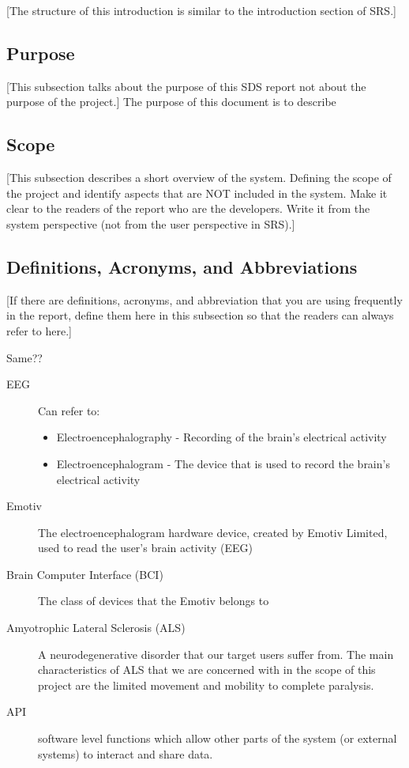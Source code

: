 \documentclass{article}
\begin{document}
[The structure of this introduction is similar to the introduction section of SRS.]

\subsection{Purpose}

[This subsection talks about the purpose of this SDS report not about the purpose of the project.]
The purpose of this document is to describe

\subsection{Scope}

[This subsection describes a short overview of the system.  Defining the scope of the project and identify aspects that are NOT included in the system.  Make it clear to the readers of the report who are the developers.  Write it from the system perspective (not from the user perspective in SRS).]

\subsection{Definitions, Acronyms, and Abbreviations}

[If there are definitions, acronyms, and abbreviation that you are using frequently in the report, define them here in this subsection so that the readers can always refer to here.]

Same??

\begin{description}
    \item[EEG] Can refer to:
        \begin{itemize}
            \item Electroencephalography - Recording of the brain's electrical
                activity 
	        \item Electroencephalogram - The device that is used to record the
	            brain's electrical activity
        \end{itemize}
    \item[Emotiv] The electroencephalogram hardware device, created by Emotiv
        Limited, used to read the user's brain activity (EEG)
    \item[Brain Computer Interface (BCI)] The class of devices that the Emotiv
        belongs to
    \item[Amyotrophic Lateral Sclerosis (ALS)] A neurodegenerative disorder
        that our target users suffer from. The main characteristics of ALS
        that we are concerned with in the scope of this project are the
        limited movement and mobility to complete paralysis.
    \item[API] software level functions which allow other parts of the system (or external systems) to interact and share data.
\end{description}
\end{document}
